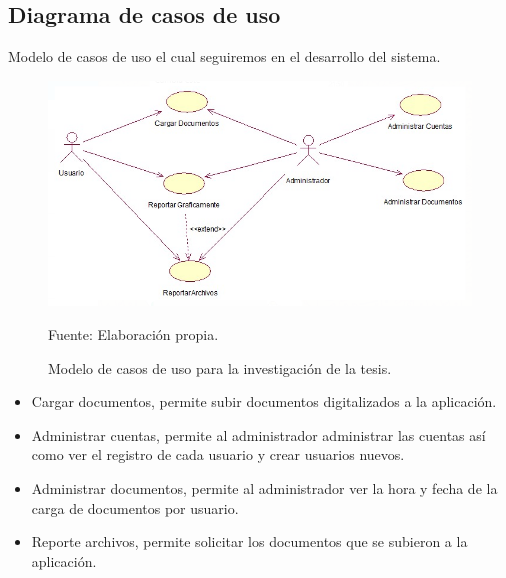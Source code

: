 \subsection{Diagrama de casos de uso}
Modelo de casos de uso el cual seguiremos en el desarrollo del sistema.

\begin{figure}[h!]
	\centering
		\includegraphics[scale=0.6]{imagenes/diagramaCasosUsoTesis.png}
		\caption{Modelo de casos de uso para la investigación de la tesis.}
	\begin{center}
    Fuente: Elaboración propia.
    \end{center}
	\label{fig:diagramaCasosUsoTesis}
\end{figure}
\begin{itemize}
    \item Cargar documentos, permite subir documentos digitalizados a la aplicación.
    \item Administrar cuentas, permite al administrador administrar las cuentas así como ver el registro de cada usuario y crear usuarios nuevos.
    \item Administrar documentos, permite al administrador ver la hora y fecha de la carga de documentos por usuario.
    \item Reporte archivos, permite solicitar los documentos que se subieron a la aplicación.
\end{itemize}

